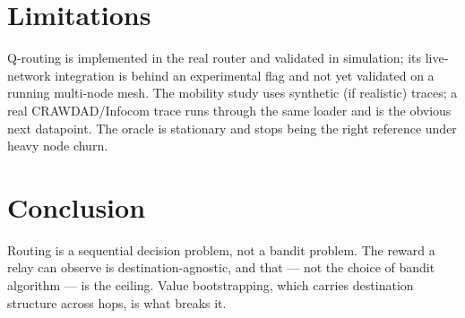 \documentclass[sigconf,nonacm]{acmart}
\begin{document}
\section{Limitations}\label{sec:limits}
Q-routing is implemented in the real router and validated in simulation; its
live-network integration is behind an experimental flag and not yet validated on a
running multi-node mesh. The mobility study uses synthetic (if realistic) traces;
a real CRAWDAD/Infocom trace runs through the same loader and is the obvious next
datapoint. The oracle is stationary and stops being the right reference under
heavy node churn.

\section{Conclusion}
Routing is a sequential decision problem, not a bandit problem. The reward a relay
can observe is destination-agnostic, and that --- not the choice of bandit
algorithm --- is the ceiling. Value bootstrapping, which carries destination
structure across hops, is what breaks it.



\end{document}
